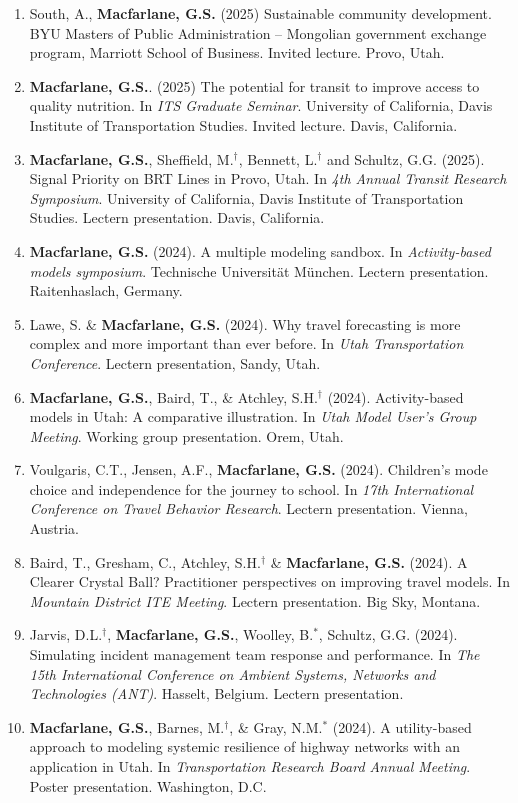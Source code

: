 \documentclass[margin,line]{res}
\newcounter{enuminitialize}
\newenvironment{myenum}[1][]
{%
 \setcounter{enuminitialize}{#1}
 \addtocounter{enuminitialize}{2}
 \begin{enumerate}[left= 4pt, itemsep=8pt, start=\value{enuminitialize}, label=\arabic*\addtocounter{enumi}{-2}]
}
{%
 \end{enumerate}
}
\begin{document}
\begin{resume}
\begin{myenum}[45]
\item South, A.,  \textbf{Macfarlane, G.S.} (2025) Sustainable community development. BYU Masters of Public Administration -- Mongolian government exchange program, Marriott School of Business. Invited lecture. Provo, Utah.
\item \textbf{Macfarlane, G.S.}. (2025) The potential for transit to improve access to quality nutrition. In \textit{ITS Graduate Seminar}. University of California, Davis Institute of Transportation Studies. Invited lecture. Davis, California.
\item \textbf{Macfarlane, G.S.}, Sheffield, M.$^\dagger$, Bennett, L.$^\dagger$ and Schultz, G.G. (2025). Signal Priority on BRT Lines in Provo, Utah. In \textit{4th Annual Transit Research Symposium}. University of California, Davis Institute of Transportation Studies. Lectern presentation. Davis, California.
\item \textbf{Macfarlane, G.S.} (2024). A multiple modeling sandbox. In \textit{Activity-based models symposium}. Technische Universit\"at M\"unchen. Lectern presentation. Raitenhaslach, Germany.
\item Lawe, S. \& \textbf{Macfarlane, G.S.} (2024). Why travel forecasting is more complex and more important than ever before. In \textit{Utah Transportation Conference}. Lectern presentation, Sandy, Utah.
\item \textbf{Macfarlane, G.S.}, Baird, T., \& Atchley, S.H.$^\dagger$ (2024). Activity-based models in Utah: A comparative illustration. In \textit{Utah Model User's Group Meeting}. Working group presentation. Orem, Utah. 
\item Voulgaris, C.T., Jensen, A.F., \textbf{Macfarlane, G.S.} (2024). Children’s mode choice and independence for the journey to school. In \textit{17th International Conference on Travel Behavior Research}. Lectern presentation. Vienna, Austria.
\item Baird, T., Gresham, C., Atchley, S.H.$^\dagger$ \& \textbf{Macfarlane, G.S.} (2024). A Clearer Crystal Ball? Practitioner perspectives on improving travel models. In \textit{Mountain District ITE Meeting}. Lectern presentation. Big Sky, Montana. 
\item Jarvis, D.L.$^\dagger$, \textbf{Macfarlane, G.S.}, Woolley, B.$^*$, Schultz, G.G. (2024). Simulating incident management team response and performance. In \textit{The 15th International Conference on Ambient Systems, Networks and Technologies (ANT)}. Hasselt, Belgium. Lectern presentation.
\item \textbf{Macfarlane, G.S.}, Barnes, M.$^\dagger$, \& Gray, N.M.$^*$ (2024).  A utility-based approach to modeling systemic resilience of highway networks with an application in Utah.  In \textit{Transportation Research Board Annual Meeting}. Poster presentation. Washington, D.C.

\end{myenum}
\end{resume}
\end{document}
